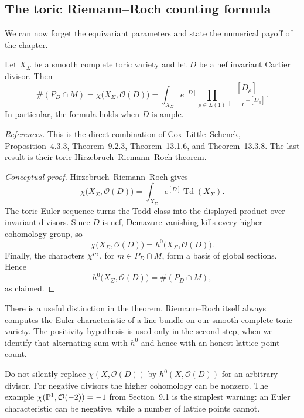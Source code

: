 \subsection{The toric Riemann--Roch counting formula}

We can now forget the equivariant parameters and state the numerical
payoff of the chapter.

\begin{theorem}
\label{thm:toric-rr-lattice-count}
Let \(X_\Sigma\) be a smooth complete toric variety and let \(D\) be a
nef invariant Cartier divisor.  Then
\[
\boxed{
\#(P_D\cap M)
=
\chi\bigl(X_\Sigma,\mathcal O(D)\bigr)
=
\int_{X_\Sigma}
e^{[D]}
\prod_{\rho\in\Sigma(1)}
\frac{[D_\rho]}{1-e^{-[D_\rho]}}.
}
\]
In particular, the formula holds when \(D\) is ample.
\end{theorem}

\noindent
\textit{References.}
This is the direct combination of Cox--Little--Schenck,
Proposition~4.3.3, Theorem~9.2.3, Theorem~13.1.6, and
Theorem~13.3.8.  The last result is their toric
Hirzebruch--Riemann--Roch theorem.

\begin{proof}[Conceptual proof]
Hirzebruch--Riemann--Roch gives
\[
\chi\bigl(X_\Sigma,\mathcal O(D)\bigr)
=
\int_{X_\Sigma}e^{[D]}\operatorname{Td}(X_\Sigma).
\]
The toric Euler sequence turns the Todd class into the displayed
product over invariant divisors.  Since \(D\) is nef, Demazure
vanishing kills every higher cohomology group, so
\[
\chi\bigl(X_\Sigma,\mathcal O(D)\bigr)
=h^0\bigl(X_\Sigma,\mathcal O(D)\bigr).
\]
Finally, the characters \(\chi^{m}\), for \(m\in P_D\cap M\),
form a basis of global sections.  Hence
\[
h^0\bigl(X_\Sigma,\mathcal O(D)\bigr)=\#(P_D\cap M),
\]
as claimed.
\end{proof}

There is a useful distinction in the theorem.  Riemann--Roch itself
always computes the Euler characteristic of a line bundle on our
smooth complete toric variety.  The positivity hypothesis is used
only in the second step, when we identify that alternating sum with
\(h^0\) and hence with an honest lattice-point count.

\begin{warningbox}
Do not silently replace \(\chi(X,\mathcal O(D))\) by \(h^0(X,\mathcal
O(D))\) for an arbitrary divisor.  For negative divisors the higher
cohomology can be nonzero.  The example
\(\chi(\mathbb{P}^1,\mathcal O(-2))=-1\) from Section~9.1 is the simplest
warning: an Euler characteristic can be negative, while a number of
lattice points cannot.
\end{warningbox}

